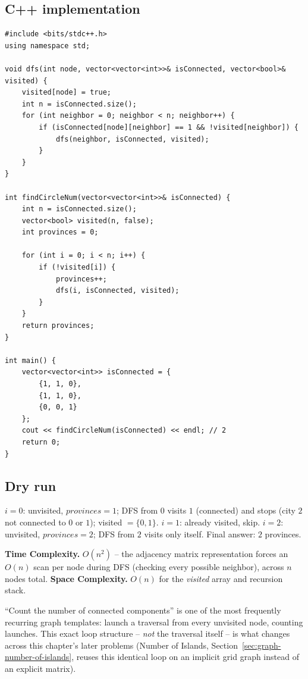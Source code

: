 \subsection*{C++ implementation}

\begin{lstlisting}
#include <bits/stdc++.h>
using namespace std;

void dfs(int node, vector<vector<int>>& isConnected, vector<bool>& visited) {
    visited[node] = true;
    int n = isConnected.size();
    for (int neighbor = 0; neighbor < n; neighbor++) {
        if (isConnected[node][neighbor] == 1 && !visited[neighbor]) {
            dfs(neighbor, isConnected, visited);
        }
    }
}

int findCircleNum(vector<vector<int>>& isConnected) {
    int n = isConnected.size();
    vector<bool> visited(n, false);
    int provinces = 0;

    for (int i = 0; i < n; i++) {
        if (!visited[i]) {
            provinces++;
            dfs(i, isConnected, visited);
        }
    }
    return provinces;
}

int main() {
    vector<vector<int>> isConnected = {
        {1, 1, 0},
        {1, 1, 0},
        {0, 0, 1}
    };
    cout << findCircleNum(isConnected) << endl; // 2
    return 0;
}
\end{lstlisting}

\subsection*{Dry run}


$i=0$: unvisited, $\textit{provinces}=1$; DFS from $0$ visits $1$
(connected) and stops (city $2$ not connected to $0$ or $1$);
visited $=\{0,1\}$. $i=1$: already visited, skip. $i=2$: unvisited,
$\textit{provinces}=2$; DFS from $2$ visits only itself. Final answer:
$2$ provinces.

\begin{complexitybox}
\textbf{Time Complexity.} $O(n^2)$ -- the adjacency matrix
representation forces an $O(n)$ scan per node during DFS (checking
every possible neighbor), across $n$ nodes total.
\textbf{Space Complexity.} $O(n)$ for the \textit{visited} array and
recursion stack.
\end{complexitybox}

\begin{takeawaybox}
``Count the number of connected components'' is one of the most
frequently recurring graph templates: launch a traversal from every
unvisited node, counting launches. This exact loop structure --
\textit{not} the traversal itself -- is what changes across this
chapter's later problems (Number of Islands, Section~\ref{sec:graph-number-of-islands},
reuses this identical loop on an implicit grid graph instead of an
explicit matrix).
\end{takeawaybox}

